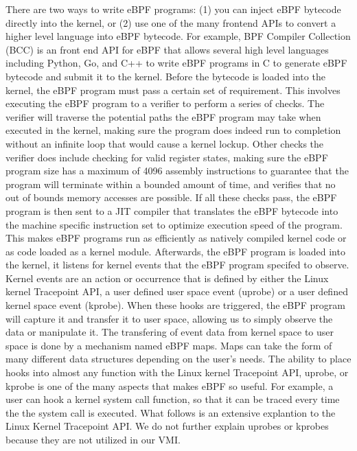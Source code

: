 \documentclass{report}
\begin{document}
\begin{spacing}{1.5}
{\large
There are two ways to write eBPF programs: (1) you can inject eBPF bytecode directly into the kernel, or (2) use one of the many frontend APIs to convert a higher level language into eBPF bytecode. For example, BPF Compiler Collection (BCC) is an front end API for eBPF that allows several high level languages including Python, Go, and C++ to write eBPF programs in C to generate eBPF bytecode and submit it to the kernel. Before the bytecode is loaded into the kernel, the eBPF program must pass a certain set of requirement. This involves executing the eBPF program to a verifier to perform a series of checks. The verifier will traverse the potential paths the eBPF program may take when executed in the kernel, making sure the program does indeed run to completion without an infinite loop that would cause a kernel lockup. Other checks the verifier does include checking for valid register states, making sure the eBPF program size has a maximum of 4096 assembly instructions to guarantee that the program will terminate within a bounded amount of time, and verifies that no out of bounds memory accesses are possible. If all these checks pass, the eBPF program is then sent to a JIT compiler that translates the eBPF bytecode into the machine specific instruction set to optimize execution speed of the program. This makes eBPF programs run as efficiently as natively compiled kernel code or as code loaded as a kernel module. Afterwards, the eBPF program is loaded into the kernel, it listens for kernel events that the eBPF program specifed to observe. Kernel events are an action or occurrence that is defined by either the Linux kernel Tracepoint API, a user defined user space event (uprobe) or a user defined kernel space event (kprobe). When these hooks are triggered, the eBPF program will capture it and transfer it to user space, allowing us to simply observe the data or manipulate it. The transfering of event data from kernel space to user space is done by a mechanism named eBPF maps. Maps can take the form of many different data structures depending on the user's needs. The ability to place hooks into almost any function with the Linux kernel Tracepoint API, uprobe, or kprobe is one of the many aspects that makes eBPF so useful. For example, a user can hook a kernel system call function, so that it can be traced every time the the system call is executed. What follows is an extensive explantion to the Linux Kernel Tracepoint API. We do not further explain uprobes or kprobes because they are not utilized in our VMI.
\newline
}



\end{spacing}
\end{document}
